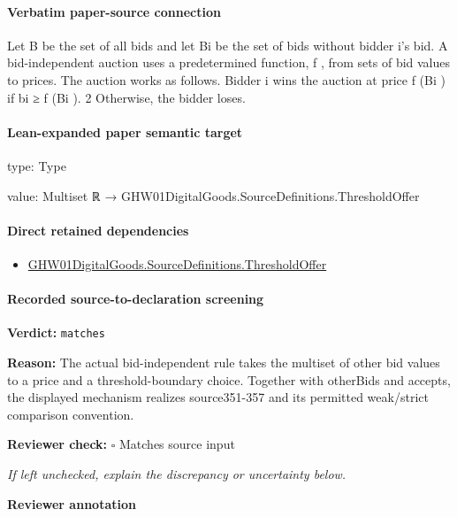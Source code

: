 \documentclass[10pt]{article}
\newcommand{\reviewerbox}{%
  \par\noindent\fbox{\parbox{0.96\linewidth}{\rule{0pt}{0.38in}}}\par
}
\newcommand{\reviewmatch}[1]{%
  \par\noindent\textbf{Reviewer check:} $\square$\; #1\par
  \noindent\emph{If left unchecked, explain the discrepancy or uncertainty below.}\par
}
\begin{document}
\paragraph{Verbatim paper-source connection}
\begin{ReviewVerbatim}
Let B be the set of all bids and let Bi be the set
of bids without bidder i’s bid. A bid-independent
auction uses a predetermined function, f , from sets
of bid values to prices. The auction works as follows.
Bidder i wins the auction at price f (Bi ) if bi ≥ f (Bi ).
2
Otherwise, the bidder loses.
\end{ReviewVerbatim}



\paragraph{Lean-expanded paper semantic target}
\begin{ReviewVerbatim}
type:
Type

value:
Multiset ℝ → GHW01DigitalGoods.SourceDefinitions.ThresholdOffer
\end{ReviewVerbatim}

\paragraph{Direct retained dependencies}
\begin{itemize}\raggedright
\item \hyperlink{governing-declaration-5888f23d4aefdde3}{GHW01\allowbreak{}Digital\allowbreak{}Goods.\allowbreak{}Source\allowbreak{}Definitions.\allowbreak{}Threshold\allowbreak{}Offer}
\end{itemize}
\paragraph{Recorded source-to-declaration screening}
\textbf{Verdict:} \texttt{matches}
\\
{\raggedright
\textbf{Reason:} The actual bid-\allowbreak{}independent rule takes the multiset of other bid values to a price and a threshold-\allowbreak{}boundary choice.\allowbreak{} Together with otherBids and accepts, the displayed mechanism realizes source351-\allowbreak{}357 and its permitted weak/\allowbreak{}strict comparison convention.\allowbreak{}
\par}
\reviewmatch{Matches source input}
\noindent\textbf{Reviewer annotation}\par
\reviewerbox
\clearpage
\hypertarget{paper-prerequisite-a38c75eea6979142}{}
\end{document}
